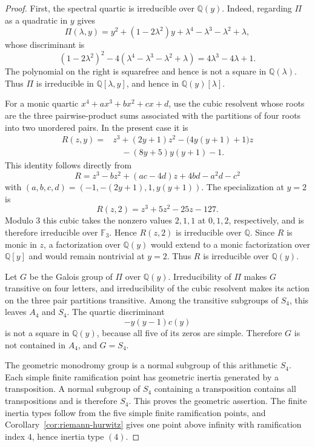 \begin{proof}
First, the spectral quartic is irreducible over $\mathbb Q(y)$.  Indeed, regarding
$\Pi$ as a quadratic in $y$ gives
\[
\Pi(\lambda,y)
=y^2+(1-2\lambda^2)y+\lambda^4-\lambda^3-\lambda^2+\lambda,
\]
whose discriminant is
\[
(1-2\lambda^2)^2
-4(\lambda^4-\lambda^3-\lambda^2+\lambda)
=4\lambda^3-4\lambda+1.
\]
The polynomial on the right is squarefree and hence is not a square in
$\mathbb Q(\lambda)$.  Thus $\Pi$ is irreducible in $\mathbb Q[\lambda,y]$, and hence
in $\mathbb Q(y)[\lambda]$.

For a monic quartic
$x^4+ax^3+bx^2+cx+d$, use the cubic resolvent whose roots are the three
pairwise-product sums associated with the partitions of four roots into two
unordered pairs.  In the present case it is
\begin{equation}\label{eq:canonical-cubic-resolvent}
\begin{split}
R(z,y)
={}&z^3+(2y+1)z^2-\bigl(4y(y+1)+1\bigr)z\\
&\quad -(8y+5)y(y+1)-1.
\end{split}
\end{equation}
This identity follows directly from
\[
R=z^3-bz^2+(ac-4d)z+4bd-a^2d-c^2
\]
with $(a,b,c,d)=(-1,-(2y+1),1,y(y+1))$.
The specialization at $y=2$ is
\[
R(z,2)=z^3+5z^2-25z-127.
\]
Modulo $3$ this cubic takes the nonzero values $2,1,1$ at $0,1,2$,
respectively, and is therefore irreducible over $\mathbb F_3$.  Hence
$R(z,2)$ is irreducible over $\mathbb Q$.  Since $R$ is monic in $z$, a
factorization over $\mathbb Q(y)$ would extend to a monic factorization over
$\mathbb Q[y]$ and would remain nontrivial at $y=2$.  Thus $R$ is irreducible over
$\mathbb Q(y)$.

Let $G$ be the Galois group of $\Pi$ over $\mathbb Q(y)$.  Irreducibility of
$\Pi$ makes $G$ transitive on four letters, and irreducibility of the cubic
resolvent makes its action on the three pair partitions transitive.  Among
the transitive subgroups of $S_4$, this leaves $A_4$ and $S_4$.  The
quartic discriminant
\[
-y(y-1)c(y)
\]
is not a square in $\mathbb Q(y)$, because all five of its zeros are simple.
Therefore $G$ is not contained in $A_4$, and $G=S_4$.

The geometric monodromy group is a normal subgroup of this arithmetic
$S_4$.  Each simple finite ramification point has geometric inertia generated
by a transposition.  A normal subgroup of $S_4$ containing a transposition
contains all transpositions and is therefore $S_4$.  This proves the
geometric assertion.  The finite inertia types follow from the five simple
finite ramification points, and Corollary~\ref{cor:riemann-hurwitz} gives one
point above infinity with ramification index $4$, hence inertia type $(4)$.


\end{proof}
